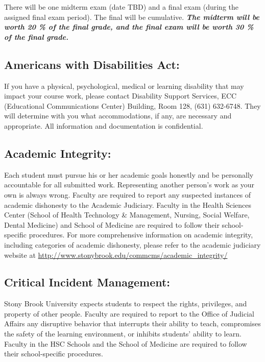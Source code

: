 \documentclass[11pt]{article}
\begin{document}
\noindent There will be one midterm exam (date TBD) and a final exam (during the assigned final exam period). The final will be cumulative. \textbf{\textit{The midterm will be worth 20 \% of the final grade, and the final exam will be worth 30 \% of the final grade.}}



\subsection*{Americans with Disabilities Act: }

\noindent If you have a physical, psychological, medical or learning
disability that may impact your course work, please contact Disability
Support Services, ECC (Educational Communications Center) Building,
Room 128, (631) 632-6748. They will determine with you what
accommodations, if any, are necessary and appropriate. All information
and documentation is confidential.

\subsection*{Academic Integrity: }

\noindent Each student must pursue his or her academic goals honestly
and be personally accountable for all submitted work. Representing
another person's work as your own is always wrong. Faculty are
required to report any suspected instances of academic dishonesty to
the Academic Judiciary. Faculty in the Health Sciences Center (School
of Health Technology \& Management, Nursing, Social Welfare, Dental
Medicine) and School of Medicine are required to follow their
school-specific procedures. For more comprehensive information on
academic integrity, including categories of academic dishonesty,
please refer to the academic judiciary website at
\url{http://www.stonybrook.edu/commcms/academic_integrity/}

\subsection*{Critical Incident Management: }

\noindent Stony Brook University expects students to respect the
rights, privileges, and property of other people. Faculty are required
to report to the Office of Judicial Affairs any disruptive behavior
that interrupts their ability to teach, compromises the safety of the
learning environment, or inhibits students' ability to learn.  Faculty
in the HSC Schools and the School of Medicine are required to follow
their school-specific procedures.
\end{document}
